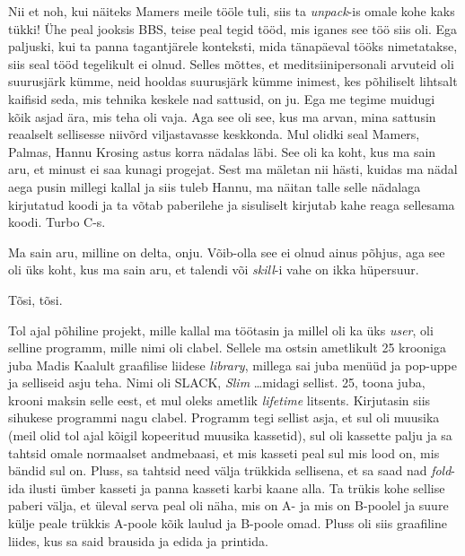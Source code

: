 Nii et noh, kui näiteks Mamers meile tööle tuli, 
siis ta \emph{unpack}-is omale kohe kaks tükki! Ühe peal jooksis BBS, teise 
peal tegid tööd, mis iganes see töö siis oli. Ega paljuski, kui ta panna 
tagantjärele konteksti, mida tänapäeval tööks nimetatakse, siis seal tööd 
tegelikult ei olnud. Selles mõttes, et meditsiinipersonali arvuteid oli 
suurusjärk kümme, neid hooldas suurusjärk kümme inimest, kes põhiliselt 
lihtsalt kaifisid seda, mis tehnika keskele nad sattusid, on ju. Ega me tegime 
muidugi kõik asjad ära, mis  teha oli vaja. Aga see oli see, kus ma 
arvan, mina sattusin reaalselt sellisesse niivõrd viljastavasse keskkonda. Mul 
olidki seal Mamers, Palmas, 
Hannu Krosing astus korra nädalas läbi. See oli ka 
koht, kus ma sain aru, et minust ei saa kunagi progejat. Sest ma mäletan nii 
hästi, kuidas ma nädal aega pusin millegi kallal ja siis tuleb Hannu, ma näitan 
talle selle nädalaga kirjutatud koodi ja ta võtab paberilehe ja sisuliselt 
kirjutab kahe reaga sellesama koodi. Turbo C-s.


Ma sain aru, milline on delta, onju. Võib-olla see ei olnud ainus põhjus, aga 
see oli üks koht, kus ma sain aru, et talendi või \emph{skill}-i vahe on ikka 
hüpersuur.


Tõsi, tõsi.

Tol ajal põhiline projekt, mille kallal ma töötasin ja millel oli ka üks 
\emph{user}, oli selline programm, mille nimi oli clabel. Sellele ma ostsin 
ametlikult 25 krooniga juba Madis Kaalult graafilise 
liidese \emph{library}, millega sai juba menüüd ja pop-uppe ja selliseid asju 
teha. Nimi oli SLACK, \emph{Slim} \ldots midagi sellist. 25, toona juba, 
krooni maksin selle eest, et mul oleks ametlik \emph{lifetime} litsents. 
Kirjutasin siis sihukese programmi nagu clabel. Programm tegi  sellist 
asja, et sul oli muusika (meil olid tol ajal kõigil kopeeritud muusika 
kassetid), sul oli kassette palju ja sa tahtsid omale normaalset andmebaasi, et 
mis kasseti peal sul mis lood on, mis bändid sul on. Pluss, sa tahtsid need 
välja trükkida sellisena, et sa saad nad \emph{fold}-ida ilusti ümber kasseti 
ja panna kasseti karbi kaane alla. Ta trükis kohe sellise paberi välja, et üleval serva 
peal oli näha, mis on A- ja mis on B-poolel ja suure külje peale trükkis 
A-poole kõik laulud ja B-poole omad. Pluss oli siis graafiline liides, kus sa 
said brausida ja edida ja printida. 

